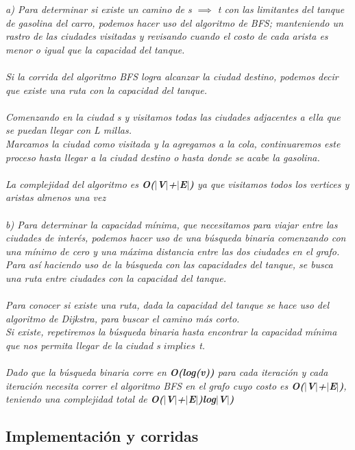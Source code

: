 \documentclass{article}
\begin{document}
\textit{a) Para determinar si existe un camino de s $\implies$ t con las limitantes del tanque de gasolina del carro, podemos hacer uso del algoritmo de BFS; manteniendo un rastro de las ciudades visitadas y revisando cuando el costo de cada arista es menor o igual que la capacidad del tanque.\\\\ Si la corrida del algoritmo BFS logra alcanzar la ciudad destino, podemos decir que existe una ruta con la capacidad del tanque.\\\\ Comenzando en la ciudad s y visitamos todas las ciudades adjacentes a ella que se puedan llegar con L millas. \\Marcamos la ciudad como visitada y la agregamos a la cola, continuaremos este proceso hasta llegar a la ciudad destino o hasta donde se acabe la gasolina. \\\\ La complejidad del algoritmo es \textbf{O($|$V$|$+$|$E$|$)} ya que visitamos todos los vertices y aristas almenos una vez}\\\\

\textit{b) Para determinar la capacidad mínima, que necesitamos para viajar entre las ciudades de interés, podemos hacer uso de una búsqueda binaria comenzando con una mínimo de cero y una máxima distancia entre las dos ciudades en el grafo. Para así haciendo uso de la búsqueda con las capacidades del tanque, se busca una ruta entre ciudades con la capacidad del tanque.\\\\ Para conocer si existe una ruta, dada la capacidad del tanque se hace uso del algoritmo de Dijkstra, para buscar el camino más corto. \\Si existe, repetiremos la búsqueda binaria hasta encontrar la capacidad mínima que nos permita llegar de la ciudad s $implies$ t. \\\\ Dado que la búsqueda binaria corre en \textbf{O(log(v))} para cada iteración y cada iteración necesita correr el algoritmo BFS en el grafo cuyo costo es \textbf{O($|$V$|$+$|$E$|$)}, teniendo una complejidad total de \textbf{O($|$V$|$+$|$E$|$)log$|$V$|$)} }


\subsection{Implementación y corridas}
\end{document}
